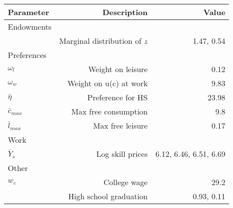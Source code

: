 \begin{tabular}{lrr}
\hline
Parameter & Description  & Value  \\ 
\hline
Endowments &   &   \\ 
 & Marginal distribution of $z$  & 1.47, 0.54  \\ 
Preferences &   &   \\ 
$\omega_{l}$ & Weight on leisure  & 0.12  \\ 
$\omega_{w}$ & Weight on u(c) at work  & 9.83  \\ 
$\bar{\eta}$ & Preference for HS  & 23.98  \\ 
$\bar{c}_{max}$ & Max free consumption  & 9.8  \\ 
$\bar{l}_{max}$ & Max free leisure  & 0.17  \\ 
Work &   &   \\ 
$\bar{Y}_{s}$ & Log skill prices  & 6.12, 6.46, 6.51, 6.69  \\ 
Other &   &   \\ 
$w_{c}$ & College wage  & 29.2  \\ 
 & High school graduation  & 0.93, 0.11  \\ 
\hline
\end{tabular}%
